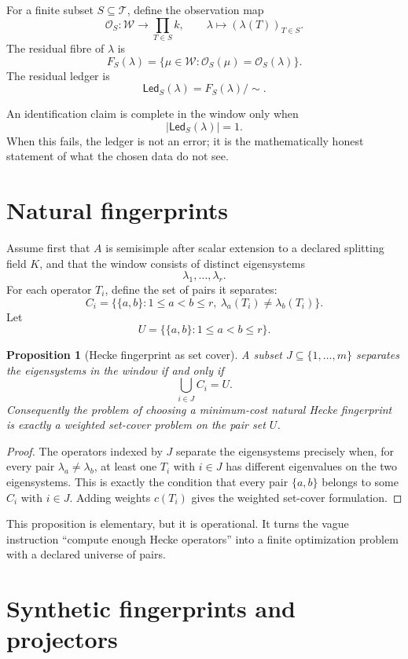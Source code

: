 \documentclass[11pt]{article}
\newtheorem{proposition}[theorem]{Proposition}
\begin{document}
For a finite subset \(S\subseteq \mathcal T\), define the observation map
\[
\mathcal O_S:\mathcal W\longrightarrow \prod_{T\in S} k,\qquad
\lambda\longmapsto(\lambda(T))_{T\in S}.
\]
The residual fibre of \(\lambda\) is
\[
F_S(\lambda)=
\{\mu\in\mathcal W:\mathcal O_S(\mu)=\mathcal O_S(\lambda)\}.
\]
The residual ledger is
\[
\mathsf{Led}_S(\lambda)=F_S(\lambda)/\sim .
\]

An identification claim is complete in the window only when
\[
|\mathsf{Led}_S(\lambda)|=1.
\]
When this fails, the ledger is not an error; it is the mathematically honest statement of what the chosen data do not see.

\section{Natural fingerprints}

Assume first that \(A\) is semisimple after scalar extension to a declared splitting field \(K\), and that the window consists of distinct eigensystems
\[
\lambda_1,\ldots,\lambda_r.
\]
For each operator \(T_i\), define the set of pairs it separates:
\[
C_i=\{\{a,b\}:1\leq a<b\leq r,\ \lambda_a(T_i)\neq\lambda_b(T_i)\}.
\]
Let
\[
U=\{\{a,b\}:1\leq a<b\leq r\}.
\]

\begin{proposition}[Hecke fingerprint as set cover]
A subset \(J\subseteq\{1,\ldots,m\}\) separates the eigensystems in the window if and only if
\[
\bigcup_{i\in J} C_i=U.
\]
Consequently the problem of choosing a minimum-cost natural Hecke fingerprint is exactly a weighted set-cover problem on the pair set \(U\).
\end{proposition}

\begin{proof}
The operators indexed by \(J\) separate the eigensystems precisely when, for every pair \(\lambda_a\neq\lambda_b\), at least one \(T_i\) with \(i\in J\) has different eigenvalues on the two eigensystems.  This is exactly the condition that every pair \(\{a,b\}\) belongs to some \(C_i\) with \(i\in J\).  Adding weights \(c(T_i)\) gives the weighted set-cover formulation.
\end{proof}

This proposition is elementary, but it is operational.  It turns the vague instruction ``compute enough Hecke operators'' into a finite optimization problem with a declared universe of pairs.

\section{Synthetic fingerprints and projectors}
\end{document}
